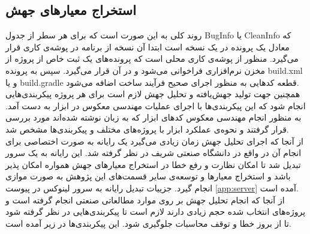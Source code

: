 \subsection{استخراج معیارهای جهش}
روند کلی به این صورت است که برای هر سطر از جدول BugInfo   یا CleanInfo که معادل یک  پرونده  در یک نسخه است ابتدا آن نسخه از برنامه در پوشه‌ی کاری قرار می‌گیرد. منظور از پوشه‌ی کاری محلی است  که پرونده‌های یک ثبت خاص از پروژه از مخزن نرم‌افزاری فراخوانی می‌شود و در آن قرار می‌گیرد. سپس به پرونده build.xml    و یا build.gradle  قطعه کدهایی  به منظور  اجرای  صحیح فرآیند ساخت اضافه می‌شود.  \\
همچنین جهت تولید جهش‌یافته و تحلیل جهش لازم است برای هر پروژه پیکربندی‌هایی انجام شود که این پیکربندی‌ها با اجرای عملیات مهندسی معکوس در ابزار  به دست آمد. به منظور انجام مهندسی معکوس کدهای ابزار که به زبان  نوشته شده‌اند مورد بررسی قرار گرفتند و نحوه‌ی عملکرد ابزار با پروژه‌های مختلف و پیکربندی‌ها مشخص شد. \\
از آنجا که اجرای تحلیل جهش زمان زیادی می‌گیرد یک رایانه به صورت اختصاصی برای انجام آن در  واقع در دانشگاه صنعتی شریف در نظر گرفته شد. این رایانه به یک سرور  تبدیل شد تا امکان نظارت و رفع خطا در استخراج معیارهای جهش همواره امکان پذیر باشد و استخراج معیارها و توسعه‌ی سایر قسمت‌های این پژوهش به صورت موازی انجام گیرد. جزییات تبدیل رایانه به سرور لینوکس در پیوست \ref{app:server} آمده است. \\
از آنجا که انجام تحلیل جهش بر روی موارد مطالعاتی صنعتی انجام گرفته است و پروژه‌های انتخاب شده حجم زیادی دارند لازم است تا پیکربندی‌هایی در نظر گرفته شود تا از بروز خطا و توقف محاسبات جلوگیری شود. این پیکربندی‌ها در زیر آمده است.  
